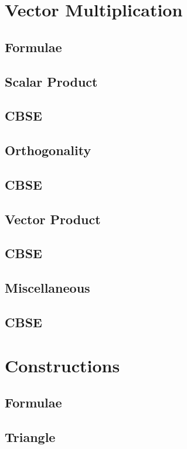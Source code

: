 \documentclass[journal]{IEEEtran}
\begin{document}
\section{Vector Multiplication}
\subsection{Formulae}

\subsection{Scalar Product}

\subsection{CBSE}

\subsection{Orthogonality}

\subsection{CBSE}

\subsection{Vector Product}

\subsection{CBSE}

\subsection{Miscellaneous}

\subsection{CBSE}

\newpage
\section{Constructions}
\subsection{Formulae}

\subsection{Triangle}

\end{document}
